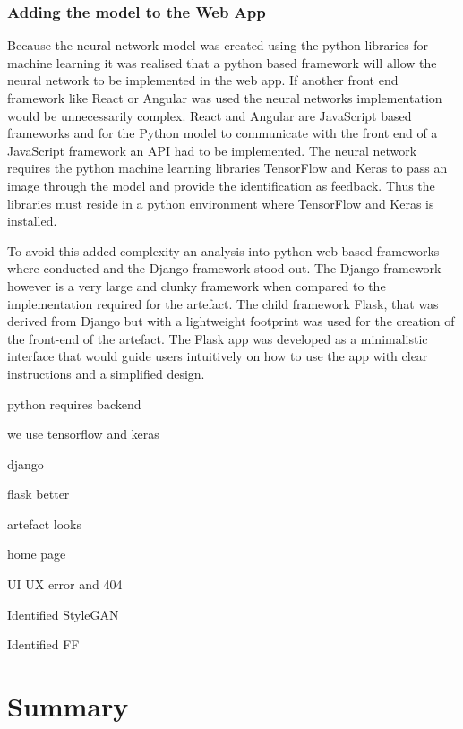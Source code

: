 \subsubsection{Adding the model to the Web App}

Because the neural network model was created using the python libraries for machine learning it was realised that a python based framework will allow the neural network to be implemented in the web app. If another front end framework like React or Angular was used the neural networks implementation would be unnecessarily complex. React and Angular are JavaScript based frameworks and for the Python model to communicate with the front end of a JavaScript framework an API had to be implemented. The neural network requires the python machine learning libraries TensorFlow and Keras to pass an image through the model and provide the identification as feedback. Thus the libraries must reside in a python environment where TensorFlow and Keras is installed. 

To avoid this added complexity an analysis into python web based frameworks where conducted and the Django framework stood out. The Django framework however is a very large and clunky framework when compared to the implementation required for the artefact. The child framework Flask, that was derived from Django but with a lightweight footprint was used for the creation of the front-end of the artefact. The Flask app was developed as a minimalistic interface that would guide users intuitively on how to use the app with clear instructions and a simplified design. 

python requires backend

we use tensorflow and keras

django

flask better

artefact looks

home page

UI UX error and 404 

Identified StyleGAN

Identified FF



\section{Summary}

